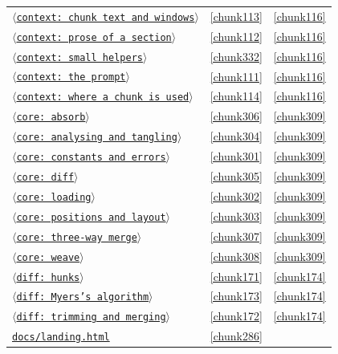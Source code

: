 \documentclass[10pt,a4paper]{article}
\newcounter{chunk}
\newcommand{\chunkname}[1]{\ensuremath{\langle}\texttt{#1}\ensuremath{\rangle}}
\begin{document}
\begin{longtable}{@{}p{}rp{}@{}}
\hyperref[chunk113]{\chunkname{context: chunk text and windows}} & \ref*{chunk113} & \hyperref[chunk116]{\ref*{chunk116}} \\
\hyperref[chunk112]{\chunkname{context: prose of a section}} & \ref*{chunk112} & \hyperref[chunk116]{\ref*{chunk116}} \\
\hyperref[chunk332]{\chunkname{context: small helpers}} & \ref*{chunk332} & \hyperref[chunk116]{\ref*{chunk116}} \\
\hyperref[chunk111]{\chunkname{context: the prompt}} & \ref*{chunk111} & \hyperref[chunk116]{\ref*{chunk116}} \\
\hyperref[chunk114]{\chunkname{context: where a chunk is used}} & \ref*{chunk114} & \hyperref[chunk116]{\ref*{chunk116}} \\
\hyperref[chunk306]{\chunkname{core: absorb}} & \ref*{chunk306} & \hyperref[chunk309]{\ref*{chunk309}} \\
\hyperref[chunk304]{\chunkname{core: analysing and tangling}} & \ref*{chunk304} & \hyperref[chunk309]{\ref*{chunk309}} \\
\hyperref[chunk301]{\chunkname{core: constants and errors}} & \ref*{chunk301} & \hyperref[chunk309]{\ref*{chunk309}} \\
\hyperref[chunk305]{\chunkname{core: diff}} & \ref*{chunk305} & \hyperref[chunk309]{\ref*{chunk309}} \\
\hyperref[chunk302]{\chunkname{core: loading}} & \ref*{chunk302} & \hyperref[chunk309]{\ref*{chunk309}} \\
\hyperref[chunk303]{\chunkname{core: positions and layout}} & \ref*{chunk303} & \hyperref[chunk309]{\ref*{chunk309}} \\
\hyperref[chunk307]{\chunkname{core: three-way merge}} & \ref*{chunk307} & \hyperref[chunk309]{\ref*{chunk309}} \\
\hyperref[chunk308]{\chunkname{core: weave}} & \ref*{chunk308} & \hyperref[chunk309]{\ref*{chunk309}} \\
\hyperref[chunk171]{\chunkname{diff: hunks}} & \ref*{chunk171} & \hyperref[chunk174]{\ref*{chunk174}} \\
\hyperref[chunk173]{\chunkname{diff: Myers's algorithm}} & \ref*{chunk173} & \hyperref[chunk174]{\ref*{chunk174}} \\
\hyperref[chunk172]{\chunkname{diff: trimming and merging}} & \ref*{chunk172} & \hyperref[chunk174]{\ref*{chunk174}} \\
\hyperref[chunk286]{\texttt{docs/\allowbreak{}landing.\allowbreak{}html}} & \ref*{chunk286} &  \\

\end{longtable}
\end{document}
